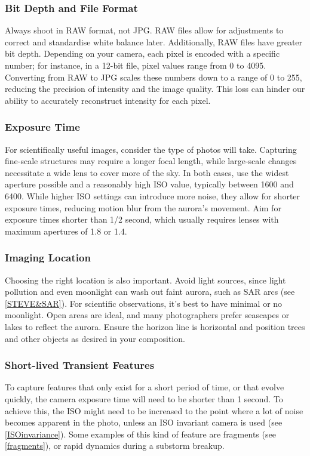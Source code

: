 \documentclass{article}
\begin{document}
\subsubsection{Bit Depth and File Format}
Always shoot in RAW format, not JPG. RAW files allow for adjustments to correct and standardise white balance later. Additionally, RAW files have greater bit depth. Depending on your camera, each pixel is encoded with a specific number; for instance, in a 12-bit file, pixel values range from 0 to 4095. Converting from RAW to JPG scales these numbers down to a range of 0 to 255, reducing the precision of intensity and the image quality. This loss can hinder our ability to accurately reconstruct intensity for each pixel.

\subsubsection{Exposure Time}
For scientifically useful images, consider the type of photos will take. Capturing fine-scale structures may require a longer focal length, while large-scale changes necessitate a wide lens to cover more of the sky. In both cases, use the widest aperture possible and a reasonably high ISO value, typically between 1600 and 6400. While higher ISO settings can introduce more noise, they allow for shorter exposure times, reducing motion blur from the aurora's movement. Aim for exposure times shorter than 1/2 second, which usually requires lenses with maximum apertures of 1.8 or 1.4.

\subsubsection{Imaging Location}
Choosing the right location is also important. Avoid light sources, since light pollution and even moonlight can wash out faint aurora, such as SAR arcs (see \ref{STEVE&SAR}). For scientific observations, it’s best to have minimal or no moonlight. Open areas are ideal, and many photographers prefer seascapes or lakes to reflect the aurora. Ensure the horizon line is horizontal and position trees and other objects as desired in your composition.

\subsubsection{Short-lived Transient Features}\label{sec:Short-timescale}
To capture features that only exist for a short period of time, or that evolve quickly, the camera exposure time will need to be shorter than 1 second. To achieve this, the ISO might need to be increased to the point where a lot of noise becomes apparent in the photo, unless an ISO invariant camera is used (see \ref{ISOinvariance}). Some examples of this kind of feature are fragments (see \ref{fragments}), or rapid dynamics during a substorm breakup.
\end{document}
